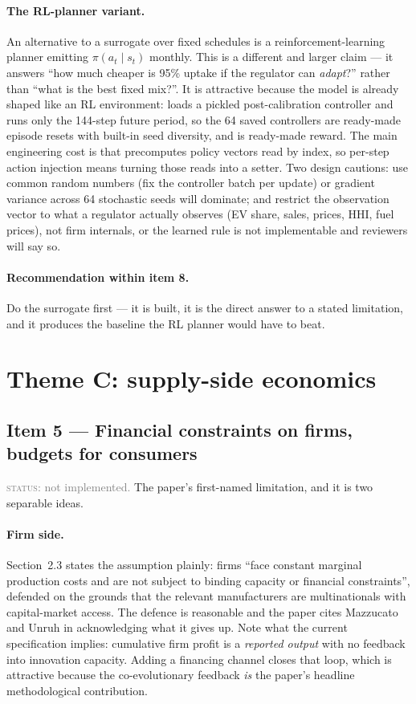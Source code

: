 \documentclass[11pt]{article}
\newcommand{\status}[1]{\textcolor{gray}{\textsc{status:} #1}}
\begin{document}
\paragraph{The RL-planner variant.} An alternative to a surrogate over
fixed schedules is a reinforcement-learning planner emitting
$\pi(a_t \mid s_t)$ monthly. This is a different and larger claim --- it
answers ``how much cheaper is 95\% uptake if the regulator can
\emph{adapt}?'' rather than ``what is the best fixed mix?''. It is
attractive because the model is already shaped like an RL environment:
 loads a pickled post-calibration
controller and runs only the 144-step future period, so the 64 saved
controllers are ready-made episode resets with built-in seed diversity, and
 is ready-made reward. The main
engineering cost is that  precomputes policy
vectors read by index, so per-step action injection means turning those
reads into a setter. Two design cautions: use common random numbers (fix
the controller batch per update) or gradient variance across 64 stochastic
seeds will dominate; and restrict the observation vector to what a
regulator actually observes (EV share, sales, prices, HHI, fuel prices), not
firm internals, or the learned rule is not implementable and reviewers will
say so.

\paragraph{Recommendation within item 8.} Do the surrogate first --- it is
built, it is the direct answer to a stated limitation, and it produces the
baseline the RL planner would have to beat.

\section{Theme C: supply-side economics}

\subsection{Item 5 --- Financial constraints on firms, budgets for consumers}

\status{not implemented.} The paper's first-named limitation, and it is two
separable ideas.

\paragraph{Firm side.} Section~2.3 states the assumption plainly: firms
``face constant marginal production costs and are not subject to binding
capacity or financial constraints'', defended on the grounds that the
relevant manufacturers are multinationals with capital-market access. The
defence is reasonable and the paper cites Mazzucato and Unruh in
acknowledging what it gives up. Note what the current specification implies:
cumulative firm profit is a \emph{reported output} with no feedback into
innovation capacity. Adding a financing channel closes that loop, which is
attractive because the co-evolutionary feedback \emph{is} the paper's
headline methodological contribution.
\end{document}
